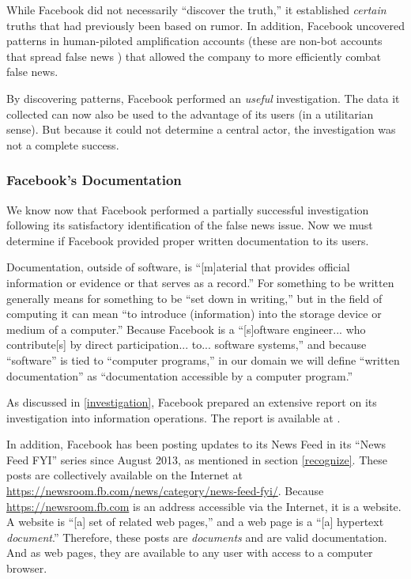 \par While Facebook did not necessarily ``discover the truth,'' it established \emph{certain} truths that had previously been based on rumor. \cite{cnn_fight} In addition, Facebook uncovered patterns in human-piloted amplification accounts (these are non-bot accounts that spread false news \cite{fb_info_ops}) that allowed the company to more efficiently combat false news.

\par By discovering patterns, Facebook performed an \emph{useful} investigation. The data it collected can now also be used to the advantage of its users (in a utilitarian sense). But because it could not determine a central actor, \cite{fb_info_ops} the investigation was not a complete success.

\subsubsection{Facebook's Documentation}

\par We know now that Facebook performed a partially successful investigation following its satisfactory identification of the false news issue. Now we must determine if Facebook provided proper written documentation to its users.

\par Documentation, outside of software, is ``[m]aterial that provides official information or evidence or that serves as a record.'' \cite{oxford} For something to be written generally means for something to be ``set down in writing,'' \cite{merriam_webster} but in the field of computing it can mean ``to introduce (information) into the storage device or medium of a computer.'' \cite{merriam_webster} Because Facebook is a ``[s]oftware engineer... who contribute[s] by direct participation... to... software systems,'' \cite{se_code} and because ``software'' is tied to ``computer programs,'' \cite{merriam_webster} in our domain we will define ``written documentation'' as ``documentation accessible by a computer program.''


\par As discussed in \ref{investigation}, Facebook prepared an extensive report on its investigation into information operations. The report is available at \cite{fb_info_ops}. 

\par In addition, Facebook has been posting updates to its News Feed in its ``News Feed FYI'' series since August 2013, as mentioned in section \ref{recognize}. These posts are collectively available on the Internet at \url{https://newsroom.fb.com/news/category/news-feed-fyi/}. Because \url{https://newsroom.fb.com} is an address accessible via the Internet, it is a website. \cite{oxford} A website is ``[a] set of related web pages,'' \cite{oxford} and a web page is a ``[a] hypertext \emph{document}.'' \cite{oxford} Therefore, these posts are \emph{documents} and are valid documentation. And as web pages, they are available to any user with access to a computer browser.


